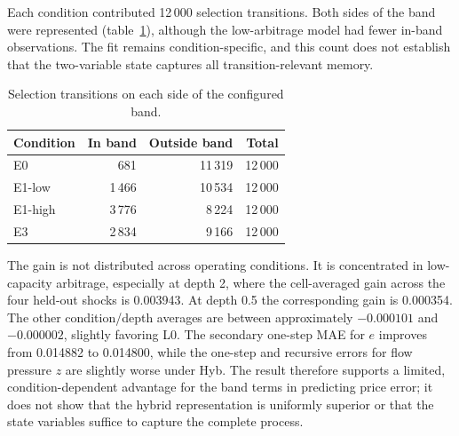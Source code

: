 Each condition contributed 12\,000 selection transitions. Both sides of the band were represented (table~\ref{tab:hybrid-regimes}), although the low-arbitrage model had fewer in-band observations. The fit remains condition-specific, and this count does not establish that the two-variable state captures all transition-relevant memory.

\begin{table}[htbp]
\centering
\caption{Selection transitions on each side of the configured band.}
\label{tab:hybrid-regimes}
\small
\begin{tabular}{@{}lrrr@{}}
\toprule
Condition & In band & Outside band & Total \\
\midrule
E0 & 681 & 11\,319 & 12\,000 \\
E1-low & 1\,466 & 10\,534 & 12\,000 \\
E1-high & 3\,776 & 8\,224 & 12\,000 \\
E3 & 2\,834 & 9\,166 & 12\,000 \\
\bottomrule
\end{tabular}
\end{table}

The gain is not distributed across operating conditions. It is concentrated in low-capacity arbitrage, especially at depth 2, where the cell-averaged gain across the four held-out shocks is 0.003943. At depth 0.5 the corresponding gain is 0.000354. The other condition/depth averages are between approximately $-0.000101$ and $-0.000002$, slightly favoring L0. The secondary one-step MAE for $e$ improves from 0.014882 to 0.014800, while the one-step and recursive errors for flow pressure $z$ are slightly worse under Hyb. The result therefore supports a limited, condition-dependent advantage for the band terms in predicting price error; it does not show that the hybrid representation is uniformly superior or that the state variables suffice to capture the complete process.

